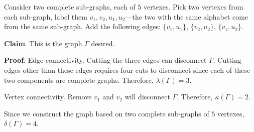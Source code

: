 \documentclass{homework}
\begin{document}
\begin{problem}{3}
Consider two complete sub-graphs, each of $5$ vertexes. Pick two vertexes from
each sub-graph, label them $v_1, v_2, u_1, u_2$---the two with the same alphabet
come from the same sub-graph. Add the following edges:
$\{v_1, u_1\}$, $\{v_2, u_2\}$, $\{v_1, u_2\}$.

\textbf{Claim}. This is the graph $\Gamma$ desired.

\textbf{Proof}. Edge connectivity. Cutting the three edges can disconnect
$\Gamma$. Cutting edges other than these edges requires four cuts
to disconnect since each of these two components are complete graphs.
Therefore, $\lambda(\Gamma) = 3$.

Vertex connectivity. Remove $v_1$ and $v_2$ will disconnect $\Gamma$.
Therefore, $\kappa(\Gamma) = 2$.

Since we construct the graph based on two complete sub-graphs of $5$ vertexes,
$\delta(\Gamma) = 4$. \QED
\end{problem}

\begin{problem}{4}
\end{problem}
\end{document}
